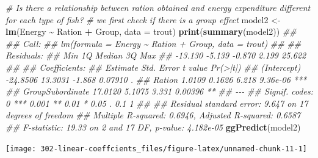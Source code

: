 \documentclass[
]{book}
\newenvironment{Shaded}{\begin{snugshade}}{\end{snugshade}}
\newcommand{\CommentTok}[1]{\textcolor[rgb]{0.56,0.35,0.01}{\textit{#1}}}
\newcommand{\DataTypeTok}[1]{\textcolor[rgb]{0.13,0.29,0.53}{#1}}
\newcommand{\KeywordTok}[1]{\textcolor[rgb]{0.13,0.29,0.53}{\textbf{#1}}}
\newcommand{\NormalTok}[1]{#1}
\newcommand{\OperatorTok}[1]{\textcolor[rgb]{0.81,0.36,0.00}{\textbf{#1}}}
\newcommand{\StringTok}[1]{\textcolor[rgb]{0.31,0.60,0.02}{#1}}
\theoremstyle{definition}
\theoremstyle{definition}
\theoremstyle{definition}
\theoremstyle{remark}
\begin{document}
\begin{Shaded}
\begin{Highlighting}[]
\CommentTok{\# Is there a relationship between ration obtained and energy expenditure different for each type of fish?}
\CommentTok{\# we first check if there is a group effect}
\NormalTok{model2 \textless{}{-}}\StringTok{ }\KeywordTok{lm}\NormalTok{(Energy }\OperatorTok{\textasciitilde{}}\StringTok{ }\NormalTok{Ration }\OperatorTok{+}\StringTok{ }\NormalTok{Group, }\DataTypeTok{data =}\NormalTok{ trout)}
\KeywordTok{print}\NormalTok{(}\KeywordTok{summary}\NormalTok{(model2))}
\CommentTok{\#\# }
\CommentTok{\#\# Call:}
\CommentTok{\#\# lm(formula = Energy \textasciitilde{} Ration + Group, data = trout)}
\CommentTok{\#\# }
\CommentTok{\#\# Residuals:}
\CommentTok{\#\#     Min      1Q  Median      3Q     Max }
\CommentTok{\#\# {-}13.130  {-}5.139  {-}0.870   2.199  25.622 }
\CommentTok{\#\# }
\CommentTok{\#\# Coefficients:}
\CommentTok{\#\#                  Estimate Std. Error t value Pr(\textgreater{}|t|)    }
\CommentTok{\#\# (Intercept)      {-}24.8506    13.3031  {-}1.868  0.07910 .  }
\CommentTok{\#\# Ration             1.0109     0.1626   6.218 9.36e{-}06 ***}
\CommentTok{\#\# GroupSubordinate  17.0120     5.1075   3.331  0.00396 ** }
\CommentTok{\#\# {-}{-}{-}}
\CommentTok{\#\# Signif. codes:  0 \textquotesingle{}***\textquotesingle{} 0.001 \textquotesingle{}**\textquotesingle{} 0.01 \textquotesingle{}*\textquotesingle{} 0.05 \textquotesingle{}.\textquotesingle{} 0.1 \textquotesingle{} \textquotesingle{} 1}
\CommentTok{\#\# }
\CommentTok{\#\# Residual standard error: 9.647 on 17 degrees of freedom}
\CommentTok{\#\# Multiple R{-}squared:  0.6946,	Adjusted R{-}squared:  0.6587 }
\CommentTok{\#\# F{-}statistic: 19.33 on 2 and 17 DF,  p{-}value: 4.182e{-}05}
\KeywordTok{ggPredict}\NormalTok{(model2)}
\end{Highlighting}
\end{Shaded}

\begin{center}\texttt{[image: 302-linear-coeffcients\_files/figure-latex/unnamed-chunk-11-1]} \end{center}
\end{document}
